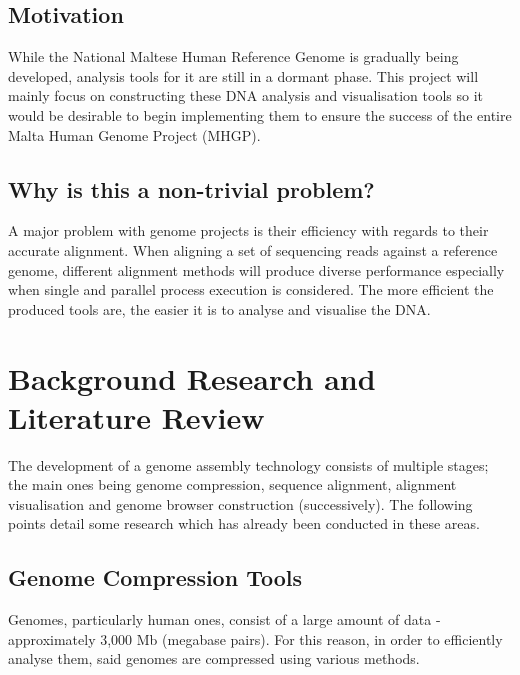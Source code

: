\documentclass{csfyp}
\begin{document}
\subsection{Motivation}\vspace{-2ex}
While the National Maltese Human Reference Genome is gradually being developed, analysis tools for it are still in a dormant phase.  This project will mainly focus on constructing these DNA analysis and visualisation tools so it would be desirable to begin implementing them to ensure the success of the entire Malta Human Genome Project (MHGP).   

\subsection{Why is this a non-trivial problem?}\vspace{-2ex}
A major problem with genome projects is their efficiency with regards to their accurate alignment.  When aligning a set of sequencing reads against a reference genome, different alignment methods will produce diverse performance especially when single and parallel process execution is considered.  The more efficient the produced tools are, the easier it is to analyse and visualise the DNA.     


\section{Background Research and Literature Review}\vspace{-2ex}

The development of a genome assembly technology consists of multiple stages; the main ones being genome compression, sequence alignment, alignment visualisation and genome browser construction (successively).  The following points detail some research which has already been conducted in these areas.

\subsection{Genome Compression Tools}\vspace{-2ex}
Genomes, particularly human ones, consist of a large amount of data - approximately 3,000 Mb (megabase pairs).  For this reason, in order to efficiently analyse them, said genomes are compressed using various methods.  
\end{document}
